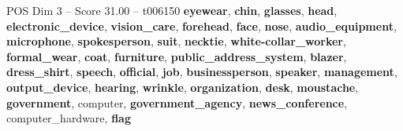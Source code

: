 \begin{textsample}{POS Dim 3 – Score 31.00 – t006150}  \label{ex:f3_pos_016}
\textbf{eyewear}, \textbf{chin}, \textbf{glasses}, \textbf{head}, \textbf{electronic\_device}, \textbf{vision\_care}, \textbf{forehead}, \textbf{face}, \textbf{nose}, \textbf{audio\_equipment}, \textbf{microphone}, \textbf{spokesperson}, \textbf{suit}, \textbf{necktie}, \textbf{white-collar\_worker}, \textbf{formal\_wear}, \textbf{coat}, \textbf{furniture}, \textbf{public\_address\_system}, \textbf{blazer}, \textbf{dress\_shirt}, \textbf{speech}, \textbf{official}, \textbf{job}, \textbf{businessperson}, \textbf{speaker}, \textbf{management}, \textbf{output\_device}, \textbf{hearing}, \textbf{wrinkle}, \textbf{organization}, \textbf{desk}, \textbf{moustache}, \textbf{government}, computer, \textbf{government\_agency}, \textbf{news\_conference}, computer\_hardware, \textbf{flag}

\end{textsample}

